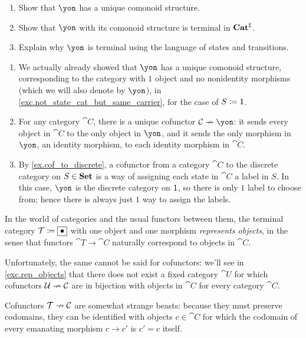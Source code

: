 \documentclass[Book-Poly]{subfiles}
\begin{document}
\begin{exercise}
\begin{enumerate}
	\item Show that $\yon$ has a unique comonoid structure.
	\item Show that $\yon$ with its comonoid structure is terminal in $\mathbf{Cat}^\sharp$.
	\item Explain why $\yon$ is terminal using the language of states and transitions.
\qedhere
\end{enumerate}
\begin{solution}
\begin{enumerate}
    \item We actually already showed that $\yon$ has a unique comonoid structure, corresponding to the category with $1$ object and no nonidentity morphisms (which we will also denote by $\yon$), in \cref{exc.not_state_cat_but_same_carrier}, for the case of $S\coloneqq\textsf{1}$.
    \item For any category $\cat{C}$, there is a unique cofunctor $\cat{C}\cof\yon$: it sends every object in $\cat{C}$ to the only object in $\yon$, and it sends the only morphism in $\yon$, an identity morphism, to each identity morphism in $\cat{C}$.
    \item By \cref{ex.cof_to_discrete}, a cofunctor from a category $\cat C$ to the discrete category on $S\in\mathbf{Set}$ is a way of assigning each state in $\cat C$ a label in $S$.
    In this case, $\yon$ is the discrete category on $\textsf{1}$, so there is only $1$ label to choose from; hence there is always just $1$ way to assign the labels.
\end{enumerate}
\end{solution}
\end{exercise}


\begin{example}\label{ex.rep_objects}
In the world of categories and the usual functors between them, the terminal category $\mathcal{T}\coloneqq\fbox{$\bullet$}$ with one object and one morphism \emph{represents objects}, in the sense that functors $\cat{T}\to\cat{C}$ naturally correspond to objects in $\cat{C}$.

Unfortunately, the same cannot be said for cofunctors: we'll see in \cref{exc.rep_objects} that there does not exist a fixed category $\cat{U}$ for which cofunctors $\mathcal{U}\nrightarrow\mathcal{C}$ are in bijection with objects in $\cat{C}$ for every category $\cat{C}$.

Cofunctors $\mathcal{T}\nrightarrow\mathcal{C}$ are somewhat strange beasts: because they must preserve codomains, they can be identified with objects $c\in\cat{C}$ for which the codomain of every emanating morphism $c\to c'$ is $c'=c$ itself. %
\end{example}
\end{document}
